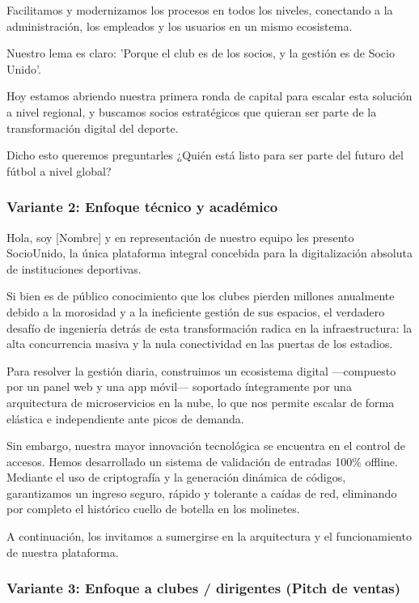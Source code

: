 Facilitamos y modernizamos los procesos en todos los niveles, conectando a la administración, los empleados y los usuarios en un mismo ecosistema.

Nuestro lema es claro: 'Porque el club es de los socios, y la gestión es de Socio Unido'.

Hoy estamos abriendo nuestra primera ronda de capital para escalar esta solución a nivel regional, y buscamos socios estratégicos que quieran ser parte de la transformación digital del deporte.

Dicho esto queremos preguntarles ¿Quién está listo para ser parte del futuro del fútbol a nivel global?

\newpage

\subsubsection{Variante 2: Enfoque técnico y académico}

Hola, soy [Nombre] y en representación de nuestro equipo les presento SocioUnido, la única plataforma integral concebida para la digitalización absoluta de instituciones deportivas.

Si bien es de público conocimiento que los clubes pierden millones anualmente debido a la morosidad y a la ineficiente gestión de sus espacios, el verdadero desafío de ingeniería detrás de esta transformación radica en la infraestructura: la alta concurrencia masiva y la nula conectividad en las puertas de los estadios.

Para resolver la gestión diaria, construimos un ecosistema digital —compuesto por un panel web y una app móvil— soportado íntegramente por una arquitectura de microservicios en la nube, lo que nos permite escalar de forma elástica e independiente ante picos de demanda.

Sin embargo, nuestra mayor innovación tecnológica se encuentra en el control de accesos. Hemos desarrollado un sistema de validación de entradas 100\% offline. Mediante el uso de criptografía y la generación dinámica de códigos, garantizamos un ingreso seguro, rápido y tolerante a caídas de red, eliminando por completo el histórico cuello de botella en los molinetes.

A continuación, los invitamos a sumergirse en la arquitectura y el funcionamiento de nuestra plataforma.

\subsubsection{Variante 3: Enfoque a clubes / dirigentes (Pitch de ventas)}

